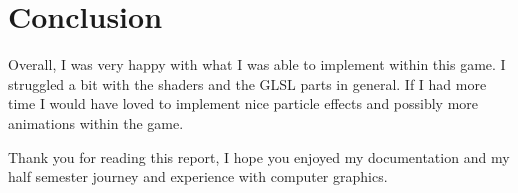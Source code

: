 \documentclass[11pt, oneside, a4paper]{article}
\begin{document}
\newpage
\section{Conclusion}
Overall, I was very happy with what I was able to implement within this game. I struggled a bit with the shaders and the GLSL parts in general. If I had more time I would have loved to implement nice particle effects and possibly more animations within the game.

Thank you for reading this report, I hope you enjoyed my documentation and my half semester journey and experience with computer graphics.
\end{document}
